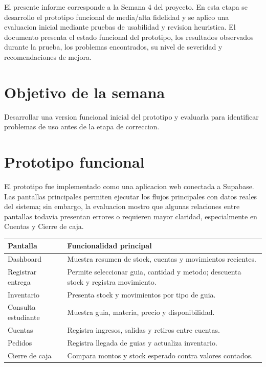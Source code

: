 \documentclass[12pt,letterpaper]{article}
\begin{document}
El presente informe corresponde a la Semana 4 del proyecto. En esta etapa se desarrollo el prototipo funcional de media/alta fidelidad y se aplico una evaluacion inicial mediante pruebas de usabilidad y revision heuristica. El documento presenta el estado funcional del prototipo, los resultados observados durante la prueba, los problemas encontrados, su nivel de severidad y recomendaciones de mejora.

\section{Objetivo de la semana}

Desarrollar una version funcional inicial del prototipo y evaluarla para identificar problemas de uso antes de la etapa de correccion.

\section{Prototipo funcional}

El prototipo fue implementado como una aplicacion web conectada a Supabase. Las pantallas principales permiten ejecutar los flujos principales con datos reales del sistema; sin embargo, la evaluacion mostro que algunas relaciones entre pantallas todavia presentan errores o requieren mayor claridad, especialmente en Cuentas y Cierre de caja.

\begin{center}
\small
\begin{tabularx}{\textwidth}{|B{3.5cm}|Y|}
\hline
Pantalla & Funcionalidad principal \\
\hline
Dashboard & Muestra resumen de stock, cuentas y movimientos recientes. \\
\hline
Registrar entrega & Permite seleccionar guia, cantidad y metodo; descuenta stock y registra movimiento. \\
\hline
Inventario & Presenta stock y movimientos por tipo de guia. \\
\hline
Consulta estudiante & Muestra guia, materia, precio y disponibilidad. \\
\hline
Cuentas & Registra ingresos, salidas y retiros entre cuentas. \\
\hline
Pedidos & Registra llegada de guias y actualiza inventario. \\
\hline
Cierre de caja & Compara montos y stock esperado contra valores contados. \\
\hline
\end{tabularx}
\end{center}
\end{document}
